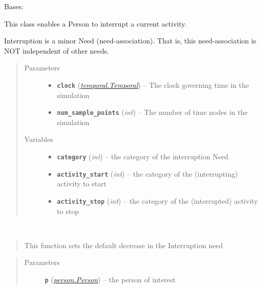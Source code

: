\documentclass[letterpaper,10pt,english]{sphinxmanual}
\begin{document}
\begin{fulllineitems}
\label{interruption:interruption.Interruption}
Bases: {\hyperref[need:need.Need]{\emph{}}}

This class enables a Person to interrupt a current activity.

Interruption is a minor Need (need-association). That is, this need-association is NOT     independent of other needs.
\begin{quote}\begin{description}
\item[{Parameters}] \leavevmode\begin{itemize}
\item {} 
\textbf{\texttt{clock}} ({\hyperref[temporal:temporal.Temporal]{\emph{\emph{temporal.Temporal}}}}) -- The clock governing time in the simulation

\item {} 
\textbf{\texttt{num\_sample\_points}} (\emph{int}) -- The number of time nodes in the simulation

\end{itemize}

\item[{Variables}] \leavevmode\begin{itemize}
\item {} 
\textbf{\texttt{category}} (\emph{int}) -- the category of the interruption Need

\item {} 
\textbf{\texttt{activity\_start}} (\emph{int}) -- the category of the (interrupting) activity to start

\item {} 
\textbf{\texttt{activity\_stop}} (\emph{int}) -- the category of the (interrupted) activity to stop

\end{itemize}

\end{description}\end{quote}

\begin{fulllineitems}
\label{interruption:interruption.Interruption.decay}~\begin{quote}

This function sets the default decrease in the Interruption need
\end{quote}
\begin{quote}\begin{description}
\item[{Parameters}] \leavevmode
\textbf{\texttt{p}} ({\hyperref[person:person.Person]{\emph{\emph{person.Person}}}}) -- the person of interest


\end{description}
\end{quote}
\end{fulllineitems}
\end{fulllineitems}
\end{document}
